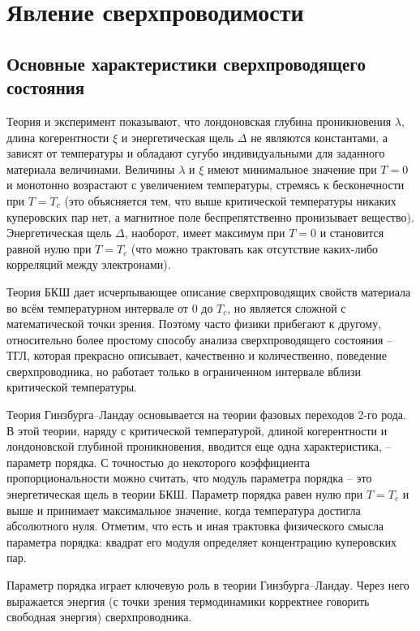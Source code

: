 \chapter{Явление сверхпроводимости}

\section{Основные характеристики сверхпроводящего состояния}

Теория и эксперимент показывают, что лондоновская глубина проникновения 
\( \lambda \), длина когерентности \( \xi \) и энергетическая щель 
\( \Delta \) не являются константами, а зависят от температуры и обладают 
сугубо индивидуальными для заданного материала величинами. Величины 
\( \lambda \) и \( \xi \) имеют минимальное значение при \( T = 0 \) и 
монотонно возрастают с увеличением температуры, стремясь к бесконечности при 
\( T = T_c \) (это объясняется тем, что выше критической температуры никаких 
куперовских пар нет, а магнитное поле беспрепятственно пронизывает вещество). 
Энергетическая щель \( \Delta \), наоборот, имеет максимум при \( T = 0 \) и 
становится равной нулю при \( T = T_c \) (что можно трактовать как отсутствие 
каких-либо корреляций между электронами).

Теория БКШ дает исчерпывающее описание сверхпроводящих свойств материала во 
всём температурном интервале от \( 0 \) до \( T_c \), но является сложной с 
математической точки зрения. Поэтому часто физики прибегают к другому, 
относительно более простому способу анализа сверхпроводящего состояния -- ТГЛ, 
которая прекрасно описывает, качественно и количественно, поведение 
сверхпроводника, но работает только в ограниченном интервале вблизи 
критической температуры.

Теория Гинзбурга–Ландау основывается на теории фазовых переходов 2-го рода. В 
этой теории, наряду с критической температурой, длиной когерентности и 
лондоновской глубиной проникновения, вводится еще одна характеристика, -- 
параметр порядка. С точностью до некоторого коэффициента пропорциональности 
можно считать, что модуль параметра порядка -- это энергетическая щель в 
теории БКШ. Параметр порядка равен нулю при \( T = T_c \) и выше и принимает 
максимальное значение, когда температура достигла абсолютного нуля. Отметим, 
что есть и иная трактовка физического смысла параметра порядка: квадрат его 
модуля определяет концентрацию куперовских пар.

Параметр порядка играет ключевую роль в теории Гинзбурга–Ландау. Через него 
выражается энергия (с точки зрения термодинамики корректнее говорить 
свободная энергия) сверхпроводника. \cite{bib:net}

